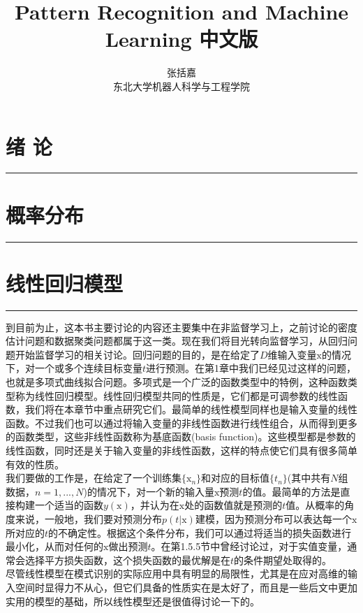 \documentclass[b5paper]{book}
\author{张括嘉 \\ 东北大学机器人科学与工程学院}
\renewcommand {\thetable} {\thechapter{}.\arabic{table}}
\renewcommand {\thefigure} {\thechapter{}.\arabic{figure}}
\numberwithin{equation}{chapter}
\newcommand {\bx} {\boldsymbol{\mathrm{x}}}
\begin{document}
\title{Pattern Recognition and Machine Learning 中文版}
\date{}
	\chapter{绪 \quad 论}
	\noindent\rule[0.25\baselineskip]{\textwidth}{1pt}
	\renewcommand {\thetable} {\thechapter{}.\arabic{table}}
	\renewcommand {\thefigure} {\thechapter{}.\arabic{figure}}
	
	\chapter{概率分布}
	\noindent\rule[0.25\baselineskip]{\textwidth}{1pt}
	\renewcommand {\thetable} {\thechapter{}.\arabic{table}}
	\renewcommand {\thefigure} {\thechapter{}.\arabic{figure}}
	
	\chapter{线性回归模型}
	\noindent\rule[0.25\baselineskip]{\textwidth}{1pt}
	\renewcommand {\thetable} {\thechapter{}.\arabic{table}}
	\renewcommand {\thefigure} {\thechapter{}.\arabic{figure}}
	\textnormal{
	\indent 到目前为止，这本书主要讨论的内容还主要集中在非监督学习上，之前讨论的密度估计问题和数据聚类问题都属于这一类。现在我们将目光转向监督学习，从回归问题开始监督学习的相关讨论。回归问题的目的，是在给定了$D$维输入变量$\bx$的情况下，对一个或多个连续目标变量$t$进行预测。在第1章中我们已经见过这样的问题，也就是多项式曲线拟合问题。多项式是一个广泛的函数类型中的特例，这种函数类型称为线性回归模型。线性回归模型共同的性质是，它们都是可调参数的线性函数，我们将在本章节中重点研究它们。最简单的线性模型同样也是输入变量的线性函数。不过我们也可以通过将输入变量的非线性函数进行线性组合，从而得到更多的函数类型，这些非线性函数称为基底函数(basis function)。这些模型都是参数的线性函数，同时还是关于输入变量的非线性函数，这样的特点使它们具有很多简单有效的性质。\\
	\indent 我们要做的工作是，在给定了一个训练集$\{\bx_n\}$和对应的目标值$\{t_n\}$(其中共有$N$组数据，$n=1,...,N$)的情况下，对一个新的输入量$\bx$预测$t$的值。最简单的方法是直接构建一个适当的函数$y(\bx)$，并认为在$\bx$处的函数值就是预测的$t$值。从概率的角度来说，一般地，我们要对预测分布$p(t|\bx)$建模，因为预测分布可以表达每一个$\bx$所对应的$t$的不确定性。根据这个条件分布，我们可以通过将适当的损失函数进行最小化，从而对任何的$\bx$做出预测$t$。在第1.5.5节中曾经讨论过，对于实值变量，通常会选择平方损失函数，这个损失函数的最优解是在$t$的条件期望处取得的。\\
	\indent 尽管线性模型在模式识别的实际应用中具有明显的局限性，尤其是在应对高维的输入空间时显得力不从心，但它们具备的性质实在是太好了，而且是一些后文中更加实用的模型的基础，所以线性模型还是很值得讨论一下的。
	}
\end{document}
